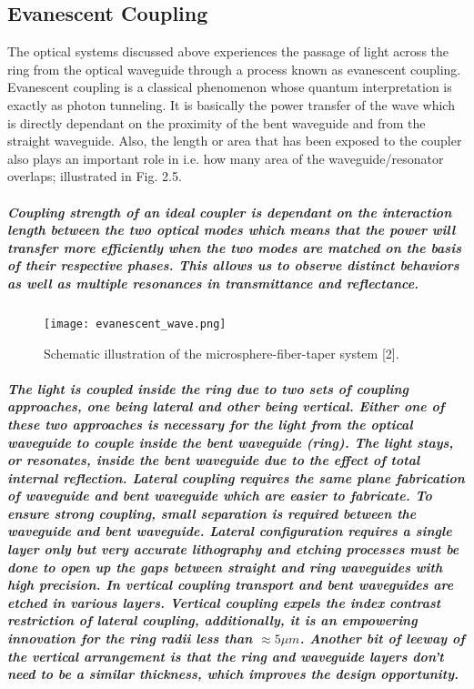 \subsection{Evanescent Coupling}
The optical systems discussed above experiences the passage of light across the ring from the optical waveguide through a process known as evanescent coupling. Evanescent coupling is a classical phenomenon whose quantum interpretation is exactly as photon tunneling. It is basically the power transfer of the wave which is directly dependant on the proximity of the bent waveguide and from the straight waveguide. Also, the length or area that has been exposed to the coupler also plays an important role in i.e. how many area of the waveguide/resonator overlaps; illustrated in Fig. 2.5.
\subparagraph{\normalfont \large Coupling strength of an ideal coupler is dependant on the interaction length between the two optical modes which means that the power will transfer more efficiently when the two modes are matched on the basis of their respective phases. This allows us to observe distinct behaviors as well as multiple resonances in transmittance and reflectance.} 

\begin{figure}[h]
\centering
\texttt{[image: evanescent\_wave.png]}
\caption{Schematic illustration of the microsphere-fiber-taper
system [2].}
\end{figure}

\subparagraph{\normalfont \large The light is coupled inside the ring due to two sets of coupling approaches, one being lateral and other being vertical. Either one of these two approaches is necessary for the light from the optical waveguide to couple inside the bent waveguide (ring). The light stays, or resonates, inside the bent waveguide due to the effect of total internal reflection. Lateral coupling requires the same plane fabrication of waveguide and bent waveguide which are easier to fabricate. To ensure strong coupling, small separation is required between the waveguide and bent waveguide. Lateral configuration requires a single layer only but very accurate lithography and etching processes must be done to open up the gaps between straight and ring waveguides with high precision. In vertical coupling transport and bent waveguides are etched in various layers. Vertical coupling expels the index contrast restriction of lateral coupling, additionally, it is an empowering innovation for the ring radii less than $ \approx5 \mu m$. Another bit of leeway of the vertical arrangement is that the ring and waveguide layers don't need to be a similar thickness, which improves the design opportunity.}


